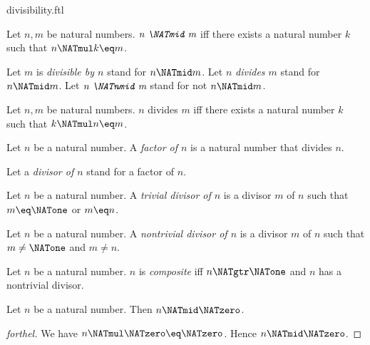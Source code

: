 \documentclass{naproche-library}
\begin{document}
\begin{smodule}[title=Divisibility]{divisibility.ftl}

\begin{definition}[forthel,id=ARITHMETIC_07_4239998993825792]
  Let $n, m$ be natural numbers.
  $\emph{n \NATmid m}$ iff there exists a natural number $k$ such that $n \NATmul k \eq m$.

  Let $m$ is \emph{divisible by $n$} stand for $n \NATmid m$.
  Let $n$ \emph{divides $m$} stand for $n \NATmid m$.
  Let $\emph{n \NATnmid m}$ stand for not $n \NATmid m$.
\end{definition}

\begin{lemma}[forthel,id=ARITHMETIC_07_1478855118290944]
  Let $n, m$ be natural numbers.
  $n$ divides $m$ iff there exists a natural number $k$ such that $k \NATmul n \eq m$.
\end{lemma}

\begin{definition}[forthel,id=ARITHMETIC_07_1311437490225152]
  Let $n$ be a natural number.
  A \emph{factor of $n$} is a natural number that divides $n$.

  Let a \emph{divisor of $n$} stand for a factor of $n$.
\end{definition}

\begin{definition}[forthel,id=ARITHMETIC_10_5438991513944064]
  Let $n$ be a natural number.
  A \emph{trivial divisor of $n$} is a divisor $m$ of $n$ such that $m \eq \NATone$ or $m \eq n$.
\end{definition}

\begin{definition}[forthel,id=ARITHMETIC_10_8768240253665280]
  Let $n$ be a natural number.
  A \emph{nontrivial divisor of $n$} is a divisor $m$ of $n$ such that $m \neq \NATone$ and $m \neq n$.
\end{definition}

\begin{definition}[forthel,id=ARITHMETIC_10_8020087063707648]
  Let $n$ be a natural number.
  $n$ is \emph{composite} iff $n \NATgtr \NATone$ and $n$ has a nontrivial divisor.
\end{definition}

\begin{proposition}[forthel,id=ARITHMETIC_07_2242720387039232]
  Let $n$ be a natural number.
  Then $n \NATmid \NATzero$.
\end{proposition}
\begin{proof}[forthel]
  We have $n \NATmul \NATzero \eq \NATzero$.
  Hence $n \NATmid \NATzero$.
\end{proof}


\end{smodule}
\end{document}
